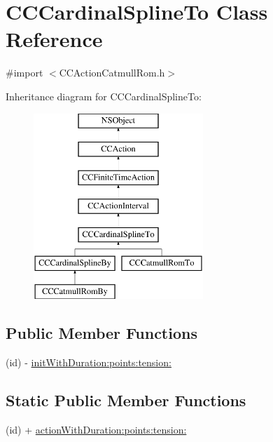 \hypertarget{interface_c_c_cardinal_spline_to}{\section{C\-C\-Cardinal\-Spline\-To Class Reference}
\label{interface_c_c_cardinal_spline_to}
}


{\ttfamily \#import $<$C\-C\-Action\-Catmull\-Rom.\-h$>$}

Inheritance diagram for C\-C\-Cardinal\-Spline\-To\-:\begin{figure}[H]
\begin{center}
\leavevmode
\includegraphics[height=7.000000cm]{interface_c_c_cardinal_spline_to}
\end{center}
\end{figure}
\subsection*{Public Member Functions}
\begin{DoxyCompactItemize}
\item 
(id) -\/ \hyperlink{interface_c_c_cardinal_spline_to_ada9539c4211dc170497809711d4d5c22}{init\-With\-Duration\-:points\-:tension\-:}
\end{DoxyCompactItemize}
\subsection*{Static Public Member Functions}
\begin{DoxyCompactItemize}
\item 
(id) + \hyperlink{interface_c_c_cardinal_spline_to_ac7c46c993b98b2ffc427349a834d1abd}{action\-With\-Duration\-:points\-:tension\-:}
\end{DoxyCompactItemize}

